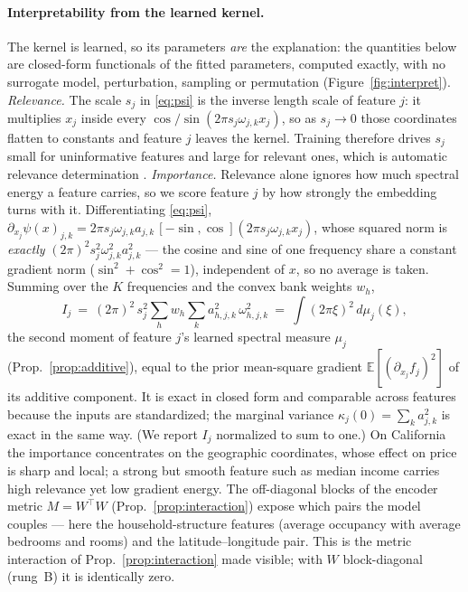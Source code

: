 \documentclass[11pt]{article}
\theoremstyle{definition}
\newcommand{\E}{\mathbb{E}}
\begin{document}
\paragraph{Interpretability from the learned kernel.} The kernel is learned, so its parameters
\emph{are} the explanation: the quantities below are closed-form functionals of the fitted
parameters, computed exactly, with no surrogate model, perturbation, sampling or permutation
(Figure~\ref{fig:interpret}). \emph{Relevance.} The scale $s_j$ in \eqref{eq:psi} is the inverse
length scale of feature $j$: it multiplies $x_j$ inside every $\cos/\sin(2\pi s_j\omega_{j,k}x_j)$,
so as $s_j\to0$ those coordinates flatten to constants and feature $j$ leaves the kernel. Training
therefore drives $s_j$ small for uninformative features and large for relevant ones, which is
automatic relevance determination \citep{neal1996,mackay1996}. \emph{Importance.} Relevance alone
ignores how much spectral energy a feature carries, so we score feature $j$ by how strongly the
embedding turns with it. Differentiating \eqref{eq:psi},
$\partial_{x_j}\psi(x)_{j,k}=2\pi s_j\omega_{j,k}a_{j,k}\,[-\sin,\cos](2\pi s_j\omega_{j,k}x_j)$,
whose squared norm is \emph{exactly} $(2\pi)^2 s_j^2\omega_{j,k}^2 a_{j,k}^2$ --- the cosine and
sine of one frequency share a constant gradient norm ($\sin^2+\cos^2=1$), independent of $x$, so no
average is taken. Summing over the $K$ frequencies and the convex bank weights $w_h$,
\begin{equation}
I_j\ =\ (2\pi)^2\,s_j^2\sum_{h} w_h\sum_{k} a_{h,j,k}^2\,\omega_{h,j,k}^2
\ =\ \int(2\pi\xi)^2\,d\mu_j(\xi),
\label{eq:ardimp}
\end{equation}
the second moment of feature $j$'s learned spectral measure $\mu_j$ (Prop.~\ref{prop:additive}),
equal to the prior mean-square gradient $\E[(\partial_{x_j}f_j)^2]$ of its additive component. It
is exact in closed form and comparable across features because the inputs are standardized; the
marginal variance $\kappa_j(0)=\sum_k a_{j,k}^2$ is exact in the same way. (We report $I_j$
normalized to sum to one.) On California the importance
concentrates on the geographic coordinates, whose effect on price is sharp and local; a strong but
smooth feature such as median income carries high relevance yet low gradient energy. The
off-diagonal blocks of the encoder metric $M=W^\top W$ (Prop.~\ref{prop:interaction}) expose which
pairs the model couples --- here the household-structure features (average occupancy with average
bedrooms and rooms) and the latitude--longitude pair. This is the metric interaction of
Prop.~\ref{prop:interaction} made visible; with $W$ block-diagonal (rung~B) it is identically zero.
\end{document}
